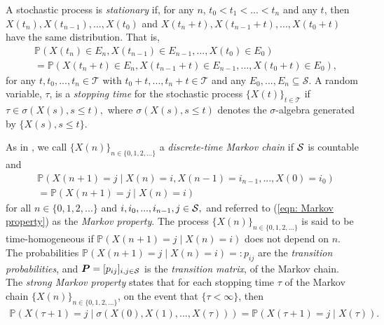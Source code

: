 A stochastic process is \emph{stationary} if, for any \(n\), \(t_0<t_1<...<t_n\) and any \(t\), then \(X(t_n),X(t_{n-1}),...,X(t_0)\) and \(X(t_n+t),X(t_{n-1}+t),...,X(t_0+t)\) have the same distribution. That is, 
\begin{align}\label{eqn: stationary}
	&\nonumber\mathbb P(X(t_n)\in E_n,X(t_{n-1})\in E_{n-1},...,X(t_0)\in E_0) 
	\\&= \mathbb P(X(t_n+t)\in E_n,X(t_{n-1}+t)\in E_{n-1},...,X(t_0+t)\in E_0),
\end{align}
for any \(t,t_0,...,t_n\in\mathcal T\) with \(t_0+t,...,t_n+t\in\mathcal T\) and any \(E_0,...,E_n\subseteq \mathcal S\). A random variable, \(\tau\), is a \emph{stopping time} for the stochastic process \(\{X(t)\}_{t\in\mathcal T}\) if \(\tau\in\sigma(X(s), s\leq t),\) where \(\sigma(X(s), s\leq t)\) denotes the \(\sigma\)-algebra generated by \(\{X(s), s\leq t\}\).

As in \cite[Chapter~1.2]{MEinAP}, we call \(\{X(n)\}_{n\in\{0,1,2,\dots\}}\) a \emph{discrete-time Markov chain} if \(\mathcal{S}\) is countable and
\begin{align}\label{eqn: Markov property}
	\nonumber &\mathbb P(X(n+1)=j \mid X(n)=i,X(n-1)=i_{n-1},...,X(0)=i_0) 
	\\&= \mathbb P(X(n+1)=j \mid X(n)=i) 
\end{align}
for all \(n\in\{0,1,2,...\}\) and \(i,i_0,...,i_{n-1},j\in\mathcal{S},\) and referred to (\ref{eqn: Markov property}) as the \emph{Markov property}. The process \(\{X(n)\}_{n\in\{0,1,2,...\}}\) is said to be time-homogeneous if 
\(\mathbb P(X(n+1)=j \mid X(n)=i)\) does not depend on \(n\). The probabilities \(\mathbb P(X(n+1)=j \mid X(n)=i)=:p_{ij}\) are the \emph{transition probabilities}, and \(\boldsymbol P=[p_{ij}]_{i,j\in\mathcal{S}}\) is the \emph{transition matrix}, of the Markov chain. The \emph{strong Markov property} states that for each stopping time \(\tau\) of the Markov chain \(\{X(n)\}_{n\in\{0,1,2,...\}}\), on the event that \(\{\tau<\infty\}\), then 
\begin{align}\label{eqn: strong Markov property}
	\mathbb P(X(\tau+1)=j \mid \sigma(X(0),X(1),...,X(\tau))) = \mathbb P(X(\tau+1)=j \mid X(\tau)).
\end{align}

